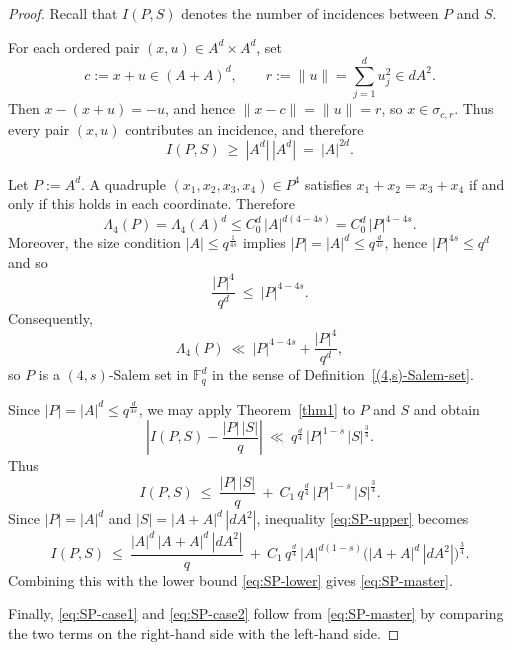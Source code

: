 \documentclass{article}
\begin{document}
\begin{proof}
Recall that $I(P,S)$ denotes the number of incidences between $P$ and $S$.

\smallskip
\noindent

For each ordered pair $(x,u)\in A^d\times A^d$, set
\[
c:=x+u\in (A+A)^d,
\qquad
r:=\|u\|=\sum_{j=1}^d u_j^2\in dA^2.
\]
Then $x-(x+u)=-u$, and hence $\|x-c\|=\|u\|=r$, so $x\in\sigma_{c,r}$.
Thus every pair $(x,u)$ contributes an incidence, and therefore
\begin{equation}\label{eq:SP-lower}
I(P,S)\ \ge\ |A^d|\,|A^d|\ =\ |A|^{2d}.
\end{equation}

\smallskip
\noindent

Let $P:=A^d$.
A quadruple $(x_1,x_2,x_3,x_4)\in P^4$ satisfies $x_1+x_2=x_3+x_4$ if and only if this holds in each coordinate.
Therefore
\[
\Lambda_4(P)=\Lambda_4(A)^d\le C_0^d\,|A|^{d(4-4s)}=C_0^d\,|P|^{4-4s}.
\]
Moreover, the size condition $|A|\le q^{\frac{1}{4s}}$ implies $|P|=|A|^d\le q^{ \frac{d}{4s}}$, hence
$|P|^{4s}\le q^d$ and so
\[
\frac{|P|^4}{q^d}\ \le\ |P|^{4-4s}.
\]
Consequently,
\[
\Lambda_4(P)\ \ll\ |P|^{4-4s}+\frac{|P|^4}{q^d},
\]
so $P$ is a $(4,s)$-Salem set in $\mathbb F_q^d$ in the sense of Definition~\ref{(4,s)-Salem-set}.

\smallskip
\noindent

Since $|P|=|A|^d\le q^{\frac{d}{4s}}$, we may apply Theorem~\ref{thm1} to $P$ and $S$ and obtain
\[
\left|I(P,S)-\frac{|P|\,|S|}{q}\right|
\ \ll\
q^{\frac{d}{4}}\,|P|^{1-s}\,|S|^{\frac{3}{4}}.
\]
Thus
\begin{equation}\label{eq:SP-upper}
I(P,S)
\ \le\
\frac{|P|\,|S|}{q}
\ +\
C_1\,q^{\frac{d}{4}}\,|P|^{1-s}\,|S|^{\frac{3}{4}}.
\end{equation}
Since $|P|=|A|^d$ and $|S|=|A+A|^d\,|dA^2|$, inequality \eqref{eq:SP-upper} becomes
\[
I(P,S)
\ \le\
\frac{|A|^d\,|A+A|^d\,|dA^2|}{q}
\ +\
C_1\,q^{\frac{d}{4}}\,|A|^{d(1-s)}\bigl(|A+A|^d\,|dA^2|\bigr)^{\frac{3}{4}}.
\]
Combining this with the lower bound \eqref{eq:SP-lower} gives \eqref{eq:SP-master}.

\smallskip
Finally, \eqref{eq:SP-case1} and \eqref{eq:SP-case2} follow from \eqref{eq:SP-master} by comparing the two terms
on the right-hand side with the left-hand side.
\end{proof}
\end{document}

